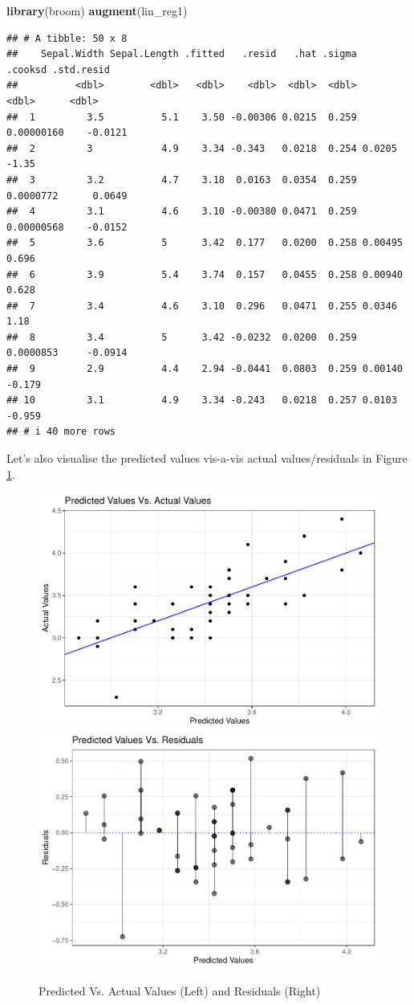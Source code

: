 \documentclass[
]{book}
\newenvironment{Shaded}{\begin{snugshade}}{\end{snugshade}}
\newcommand{\FunctionTok}[1]{\textcolor[rgb]{0.13,0.29,0.53}{\textbf{#1}}}
\newcommand{\NormalTok}[1]{#1}
\begin{document}
\begin{Shaded}
\begin{Highlighting}[]
\FunctionTok{library}\NormalTok{(broom)}
\FunctionTok{augment}\NormalTok{(lin\_reg1)}
\end{Highlighting}
\end{Shaded}

\begin{verbatim}
## # A tibble: 50 x 8
##    Sepal.Width Sepal.Length .fitted   .resid   .hat .sigma    .cooksd .std.resid
##          <dbl>        <dbl>   <dbl>    <dbl>  <dbl>  <dbl>      <dbl>      <dbl>
##  1         3.5          5.1    3.50 -0.00306 0.0215  0.259 0.00000160    -0.0121
##  2         3            4.9    3.34 -0.343   0.0218  0.254 0.0205        -1.35  
##  3         3.2          4.7    3.18  0.0163  0.0354  0.259 0.0000772      0.0649
##  4         3.1          4.6    3.10 -0.00380 0.0471  0.259 0.00000568    -0.0152
##  5         3.6          5      3.42  0.177   0.0200  0.258 0.00495        0.696 
##  6         3.9          5.4    3.74  0.157   0.0455  0.258 0.00940        0.628 
##  7         3.4          4.6    3.10  0.296   0.0471  0.255 0.0346         1.18  
##  8         3.4          5      3.42 -0.0232  0.0200  0.259 0.0000853     -0.0914
##  9         2.9          4.4    2.94 -0.0441  0.0803  0.259 0.00140       -0.179 
## 10         3.1          4.9    3.34 -0.243   0.0218  0.257 0.0103        -0.959 
## # i 40 more rows
\end{verbatim}

Let's also visualise the predicted values vis-a-vis actual values/residuals in Figure \ref{fig:predvsact}.

\begin{figure}

{\centering \includegraphics[width=0.48\linewidth]{DauR_files/figure-latex/predvsact-1} \includegraphics[width=0.48\linewidth]{DauR_files/figure-latex/predvsact-2} 

}

\caption{Predicted Vs. Actual Values (Left) and Residuals (Right)}\label{fig:predvsact}
\end{figure}
\end{document}
